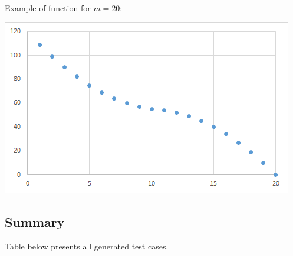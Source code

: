 Example of function for $m = 20$:

\begin{center}
	\includegraphics[scale=0.7]{satfun2}
\end{center}

\subsection{Summary}

Table below presents all generated test cases.

